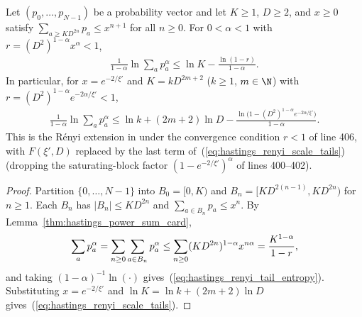 \begin{lemma}
    \label{thm:hastings_renyi_tail_entropy}
    \leanok
    Let $(p_0,\dots,p_{N-1})$ be a probability vector and let $K\ge1$, $D\ge2$,
    and $x\ge0$ satisfy $\sum_{a\ge KD^{2n}}p_a\le x^{n+1}$ for all $n\ge0$.
    For $0<\alpha<1$ with $r=(D^2)^{1-\alpha}x^\alpha<1$,
    \begin{align}
        \frac1{1-\alpha}\ln\sum_ap_a^\alpha\le\ln K-\frac{\ln(1-r)}{1-\alpha}.
        \label{eq:hastings_renyi_tail_entropy}
    \end{align}
    In particular, for $x=e^{-2/\xi'}$ and $K=kD^{2m+2}$ ($k\ge1$, $m\in\N$)
    with $r=(D^2)^{1-\alpha}e^{-2\alpha/\xi'}<1$,
    \begin{align}
        \frac1{1-\alpha}\ln\sum_ap_a^\alpha\le\ln k+(2m+2)\ln D
        -\frac{\ln\bigl(1-(D^2)^{1-\alpha}e^{-2\alpha/\xi'}\bigr)}{1-\alpha}.
        \label{eq:hastings_renyi_scale_tails}
    \end{align}
    This is the Rényi extension in \cite[Lemma~2, lines 392--410]{Hastings2007AreaLaw}
    under the convergence condition $r<1$ of line 406, with $F(\xi',D)$ replaced
    by the last term of~(\ref{eq:hastings_renyi_scale_tails}) (dropping the
    saturating-block factor $(1-e^{-2/\xi'})^\alpha$ of lines 400--402).
\end{lemma}
\begin{proof}\leanok
    Partition $\{0,\dots,N-1\}$ into $B_0=[0,K)$ and
    $B_n=[KD^{2(n-1)},KD^{2n})$ for $n\ge1$. Each $B_n$ has
    $|B_n|\le KD^{2n}$ and $\sum_{a\in B_n}p_a\le x^n$. By
    Lemma~\ref{thm:hastings_power_sum_card},
    \begin{align}
        \sum_ap_a^\alpha=\sum_{n\ge0}\sum_{a\in B_n}p_a^\alpha
        \le\sum_{n\ge0}(KD^{2n})^{1-\alpha}x^{n\alpha}
        =\frac{K^{1-\alpha}}{1-r},
        \notag
    \end{align}
    and taking $(1-\alpha)^{-1}\ln(\cdot)$ gives~(\ref{eq:hastings_renyi_tail_entropy}).
    Substituting $x=e^{-2/\xi'}$ and $\ln K=\ln k+(2m+2)\ln D$
    gives~(\ref{eq:hastings_renyi_scale_tails}).
\end{proof}

